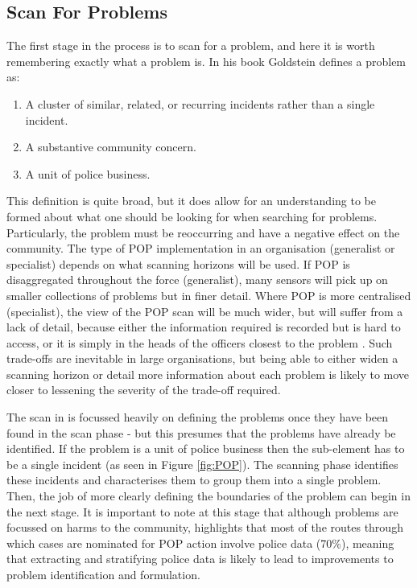 \subsection{Scan For Problems} The first stage in the process is to scan for a problem, and here it is worth remembering exactly what a problem is. In his book \textcite{goldstein1990}  Goldstein defines a problem as:

\begin{enumerate}

\item A cluster of similar, related, or recurring incidents rather than a single incident.
\item A substantive community concern.
\item A unit of police business.

\end{enumerate}


This definition is quite broad, but it does allow for an understanding to be formed about what one should be looking for when searching for problems. Particularly, the problem must be reoccurring and have a negative effect on the community. The type of POP implementation in an organisation (generalist or specialist) depends on what scanning horizons will be used. If POP is disaggregated throughout the force (generalist), many sensors will pick up on smaller collections of problems but in finer detail. Where POP is more centralised (specialist), the view of the POP scan will be much wider, but will suffer from a lack of detail, because either the information required is recorded but is hard to access, or it is simply in the heads of the officers closest to the problem \parencite{goldstein1990}. Such trade-offs are inevitable in large organisations, but being able to either widen a scanning horizon or detail more information about each problem is likely to move closer to lessening the severity of the trade-off required.

The scan in  is focussed heavily on defining the problems once they have been found in the scan phase - but this presumes that the problems have already be identified. If the problem is a unit of police business then the sub-element has to be a single incident (as seen in Figure \ref{fig:POP}). The scanning phase identifies these incidents and characterises them to group them into a single problem. Then, the job of more clearly defining the boundaries of the problem can begin in the next stage. It is important to note at this stage that although problems are focussed on harms to the community,  \textcite{maguire2015problem} highlights that most of the routes through which cases are nominated for POP action involve police data (70\%), meaning that extracting and stratifying police data is likely to lead to improvements to problem identification and formulation.

